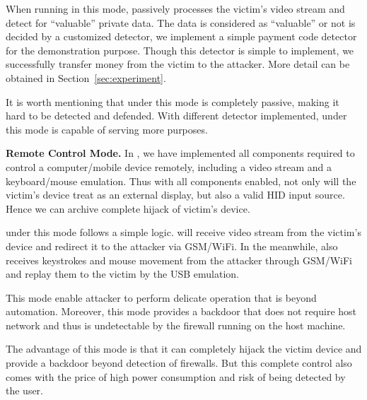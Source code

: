 When running in this mode, \tool passively processes the victim's video stream
and detect for ``valuable'' private data.  The data is considered as
``valuable'' or not is decided by a customized detector, we implement a simple
payment code detector for the demonstration purpose. Though this detector is
simple to implement, we successfully transfer money from the victim to the
attacker. More detail can be obtained in Section~\ref{sec:experiment}.

It is worth mentioning that \tool under this mode is completely passive, making
it hard to be detected and defended. With different detector implemented, \tool
under this mode is capable of serving more purposes.

\textbf{Remote Control Mode.} In \tool, we have implemented all components
required to control a computer/mobile device remotely, including a video stream
and a keyboard/mouse emulation. Thus with all components enabled, not only will
the victim's device treat \tool as an external display, but also a valid HID
input source. Hence we can archive complete hijack of victim's device.

\tool under this mode follows a simple logic. \tool will receive video stream
from the victim's device and redirect it to the attacker via GSM/WiFi. In the
meanwhile, \tool also receives keystrokes and mouse movement from the attacker
through GSM/WiFi and replay them to the victim by the USB emulation.

This mode enable attacker to perform delicate operation that is beyond
automation. Moreover, this mode provides a backdoor that does not require host
network and thus is undetectable by the firewall running on the host machine.

The advantage of this mode is that it can completely hijack the victim device
and provide a backdoor beyond detection of firewalls. But this complete control
also comes with the price of high power consumption and risk of being detected
by the user.

